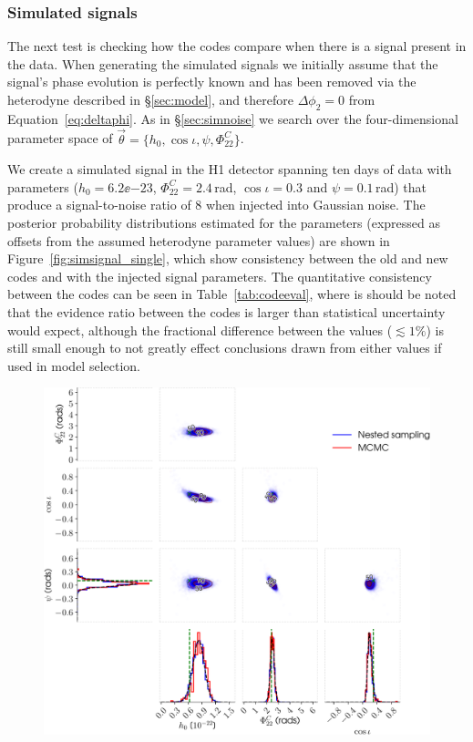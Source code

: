 \subsubsection{Simulated signals}\label{sec:simsignal}

The next test is checking how the codes compare when there is a signal present in the data. When generating the simulated signals we initially
assume that the signal's phase evolution is perfectly known and has been removed via the heterodyne described in \S\ref{sec:model}, and therefore
$\Delta\phi_2 = 0$ from Equation~\ref{eq:deltaphi}. As in \S\ref{sec:simnoise} we search over the four-dimensional parameter space of
$\vec{\theta} = \{h_0, \cos{\iota}, \psi, \Phi_{22}^C\}$.

We create a simulated signal in the H1 detector spanning ten days of data with parameters ($h_0 = 6.2\ee{-23}$, $\Phi_{22}^C = 2.4$\,rad, $\cos{\iota} = 0.3$
and $\psi = 0.1$\,rad) that produce a signal-to-noise ratio of 8 when injected into
Gaussian noise. The posterior probability distributions estimated for the parameters (expressed as offsets from the assumed heterodyne parameter values) are
shown in Figure~\ref{fig:simsignal_single}, which show consistency
between the old and new codes and with the injected signal parameters. The quantitative consistency between the codes can be seen in Table~\ref{tab:codeeval},
where is should be noted that the evidence ratio between the codes is larger than statistical uncertainty would expect, although the fractional difference between
the values ($\lesssim 1\%$) is still small enough to not greatly effect conclusions drawn from either values if used in model selection.

\begin{figure}[!phtb]
\begin{center}
\includegraphics[width=1\columnwidth]{./figures/codeeval/simulations/signal/simulatedsignaltest}
\caption{ \protect}
\end{center}
\end{figure}

